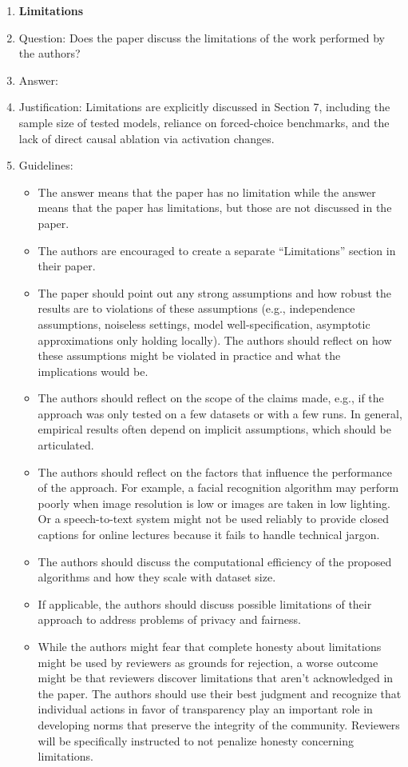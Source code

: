 \documentclass{article}
\begin{document}
\begin{enumerate}
\item {\bf Limitations}
    \item[] Question: Does the paper discuss the limitations of the work performed by the authors?
    \item[] Answer: \answerYes{}
    \item[] Justification: Limitations are explicitly discussed in Section 7, including the sample size of tested models, reliance on forced-choice benchmarks, and the lack of direct causal ablation via activation changes.
    \item[] Guidelines:
    \begin{itemize}
        \item The answer \answerNA{} means that the paper has no limitation while the answer \answerNo{} means that the paper has limitations, but those are not discussed in the paper. 
        \item The authors are encouraged to create a separate ``Limitations'' section in their paper.
        \item The paper should point out any strong assumptions and how robust the results are to violations of these assumptions (e.g., independence assumptions, noiseless settings, model well-specification, asymptotic approximations only holding locally). The authors should reflect on how these assumptions might be violated in practice and what the implications would be.
        \item The authors should reflect on the scope of the claims made, e.g., if the approach was only tested on a few datasets or with a few runs. In general, empirical results often depend on implicit assumptions, which should be articulated.
        \item The authors should reflect on the factors that influence the performance of the approach. For example, a facial recognition algorithm may perform poorly when image resolution is low or images are taken in low lighting. Or a speech-to-text system might not be used reliably to provide closed captions for online lectures because it fails to handle technical jargon.
        \item The authors should discuss the computational efficiency of the proposed algorithms and how they scale with dataset size.
        \item If applicable, the authors should discuss possible limitations of their approach to address problems of privacy and fairness.
        \item While the authors might fear that complete honesty about limitations might be used by reviewers as grounds for rejection, a worse outcome might be that reviewers discover limitations that aren't acknowledged in the paper. The authors should use their best judgment and recognize that individual actions in favor of transparency play an important role in developing norms that preserve the integrity of the community. Reviewers will be specifically instructed to not penalize honesty concerning limitations.
    \end{itemize}


\end{enumerate}
\end{document}
